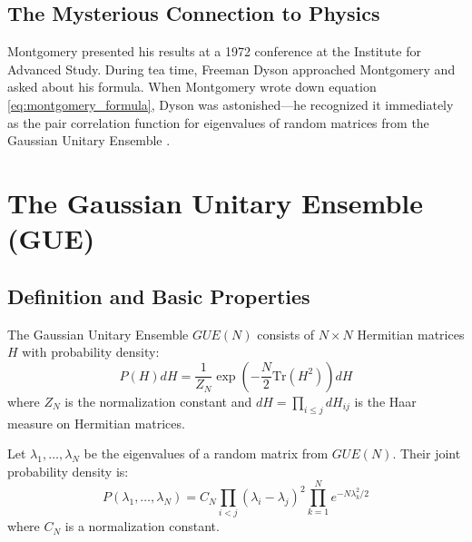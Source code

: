 \subsection{The Mysterious Connection to Physics}

\begin{historicalnote}
Montgomery presented his results at a 1972 conference at the Institute for Advanced Study. During tea time, Freeman Dyson approached Montgomery and asked about his formula. When Montgomery wrote down equation \eqref{eq:montgomery_formula}, Dyson was astonished—he recognized it immediately as the pair correlation function for eigenvalues of random matrices from the Gaussian Unitary Ensemble \cite{montgomery1973}.
\end{historicalnote}

\section{The Gaussian Unitary Ensemble (GUE)}
\label{sec:gue}

\subsection{Definition and Basic Properties}

\begin{definition}
\label{def:gue}
The Gaussian Unitary Ensemble $GUE(N)$ consists of $N \times N$ Hermitian matrices $H$ with probability density:
\begin{equation}
P(H) dH = \frac{1}{Z_N} \exp\left(-\frac{N}{2} \text{Tr}(H^2)\right) dH
\label{eq:gue_measure}
\end{equation}
where $Z_N$ is the normalization constant and $dH = \prod_{i \leq j} dH_{ij}$ is the Haar measure on Hermitian matrices.
\end{definition}

\begin{theorem}
\label{thm:gue_eigenvalues}
Let $\lambda_1, \ldots, \lambda_N$ be the eigenvalues of a random matrix from $GUE(N)$. Their joint probability density is:
\begin{equation}
P(\lambda_1, \ldots, \lambda_N) = C_N \prod_{i < j} (\lambda_i - \lambda_j)^2 \prod_{k=1}^N e^{-N\lambda_k^2/2}
\label{eq:gue_eigenvalue_density}
\end{equation}
where $C_N$ is a normalization constant.
\end{theorem}

